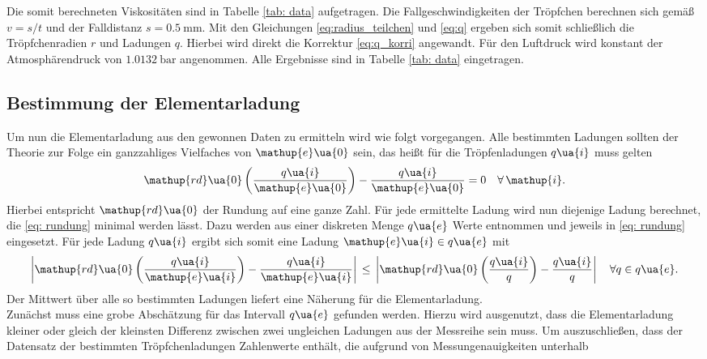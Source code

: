 Die somit berechneten Viskositäten sind in Tabelle \ref{tab: data} aufgetragen.
Die Fallgeschwindigkeiten der Tröpfchen berechnen sich gemäß $v = s/t$ und der Falldistanz $s = \SI{0.5}{\milli\meter}$.
Mit den Gleichungen \eqref{eq:radius_teilchen} und \eqref{eq:q} ergeben sich somit schließlich die Tröpfchenradien $r$ und Ladungen $q$. Hierbei wird
direkt die Korrektur \eqref{eq:q_korri} angewandt. Für den Luftdruck wird konstant der Atmosphärendruck von
$\SI{1.0132}{\bar}$ angenommen. Alle Ergebnisse sind in Tabelle \ref{tab: data} eingetragen. \\


\subsection{Bestimmung der Elementarladung}
Um nun die Elementarladung aus den gewonnen Daten zu ermitteln wird wie folgt vorgegangen. Alle bestimmten
Ladungen sollten der Theorie zur Folge ein ganzzahliges Vielfaches von $\mathup{e}\ua{0}$ sein, das heißt für die %
Tröpfenladungen $q\ua{i}$ muss gelten
\begin{equation}
  \mathup{rd}\ua{0}\left(\frac{q\ua{i}}{\mathup{e}\ua{0}}\right) - \frac{q\ua{i}}{\mathup{e}\ua{0}} = 0 \quad \forall\, \mathup{i}.
  \label{eq: rundung}
\end{equation}
Hierbei entspricht $\mathup{rd}\ua{0}$ der Rundung auf eine ganze Zahl. Für jede ermittelte Ladung wird nun diejenige
Ladung berechnet, die \eqref{eq: rundung} minimal werden lässt. Dazu werden aus einer diskreten Menge $q\ua{e}$ Werte entnommen
und jeweils in \eqref{eq: rundung} eingesetzt. Für jede Ladung $q\ua{i}$ ergibt sich somit eine Ladung $\mathup{e}\ua{i} \in q\ua{e}$ mit
\begin{equation}
  \left|\mathup{rd}\ua{0}\left(\frac{q\ua{i}}{\mathup{e}\ua{i}}\right) - \frac{q\ua{i}}{\mathup{e}\ua{i}}\right| \,\leq\,
  \left|\mathup{rd}\ua{0}\left(\frac{q\ua{i}}{q}\right) - \frac{q\ua{i}}{q} \right| \quad \forall q \in q\ua{e}.
\end{equation}
Der Mittwert über alle so bestimmten Ladungen liefert eine Näherung für die Elementarladung.\\
Zunächst muss eine grobe Abschätzung für das Intervall $q\ua{e}$ gefunden werden. Hierzu wird ausgenutzt, dass die Elementarladung
kleiner oder gleich der kleinsten Differenz zwischen zwei ungleichen Ladungen aus der Messreihe sein muss. Um auszuschließen, dass
der Datensatz der bestimmten Tröpfchenladungen Zahlenwerte enthält, die aufgrund von Messungenauigkeiten unterhalb
